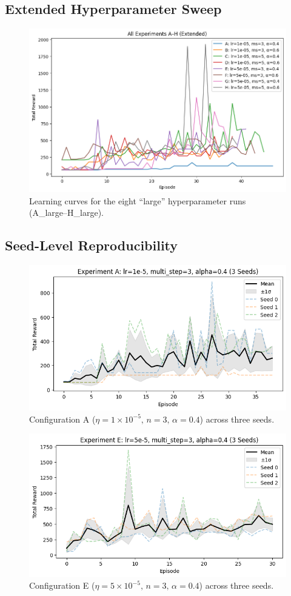 \documentclass{article}
\begin{document}
\subsection{Extended Hyperparameter Sweep}
\begin{figure}[H]
  \centering
  \includegraphics[width=0.9\linewidth]{rainbow_8Extended.png}
  \caption{Learning curves for the eight “large” hyperparameter runs (A\_large–H\_large).}
  \label{fig:extended_sweep}
\end{figure}

\subsection{Seed-Level Reproducibility}
\begin{figure}[H]
  \centering
  \includegraphics[width=0.8\linewidth]{rainbow_A_seed.png}
  \caption{Configuration A (\(\eta=1\times10^{-5},\,n=3,\,\alpha=0.4\)) across three seeds.}
  \label{fig:seed_A}
\end{figure}

\begin{figure}[H]
  \centering
  \includegraphics[width=0.8\linewidth]{rainbow_E_Seed.png}
  \caption{Configuration E (\(\eta=5\times10^{-5},\,n=3,\,\alpha=0.4\)) across three seeds.}
  \label{fig:seed_E}
\end{figure}
\end{document}
